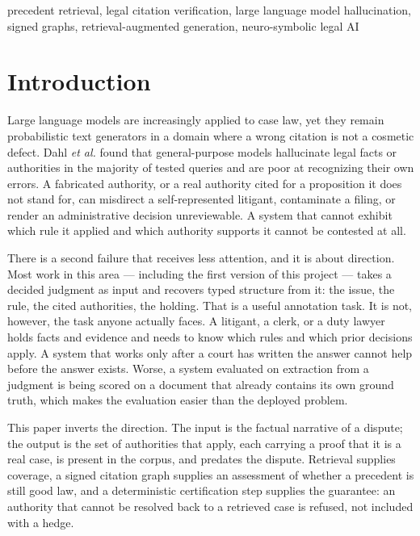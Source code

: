 \documentclass[10pt,conference]{IEEEtran}
\begin{document}
\begin{IEEEkeywords}
precedent retrieval, legal citation verification, large language model hallucination,
signed graphs, retrieval-augmented generation, neuro-symbolic legal AI
\end{IEEEkeywords}

\section{Introduction}

Large language models are increasingly applied to case law, yet they remain probabilistic
text generators in a domain where a wrong citation is not a cosmetic defect. Dahl
\emph{et al.} \cite{dahl2024} found that general-purpose models hallucinate legal facts or
authorities in the majority of tested queries and are poor at recognizing their own errors.
A fabricated authority, or a real authority cited for a proposition it does not stand for,
can misdirect a self-represented litigant, contaminate a filing, or render an
administrative decision unreviewable. A system that cannot exhibit which rule it applied
and which authority supports it cannot be contested at all.

There is a second failure that receives less attention, and it is about direction. Most
work in this area --- including the first version of this project --- takes a decided
judgment as input and recovers typed structure from it: the issue, the rule, the cited
authorities, the holding. That is a useful annotation task. It is not, however, the task
anyone actually faces. A litigant, a clerk, or a duty lawyer holds facts and evidence and
needs to know which rules and which prior decisions apply. A system that works only after a
court has written the answer cannot help before the answer exists. Worse, a system evaluated
on extraction from a judgment is being scored on a document that already contains its own
ground truth, which makes the evaluation easier than the deployed problem.

This paper inverts the direction. The input is the factual narrative of a dispute; the
output is the set of authorities that apply, each carrying a proof that it is a real case,
is present in the corpus, and predates the dispute. Retrieval supplies coverage, a signed
citation graph supplies an assessment of whether a precedent is still good law, and a
deterministic certification step supplies the guarantee: an authority that cannot be
resolved back to a retrieved case is refused, not included with a hedge.
\end{document}
